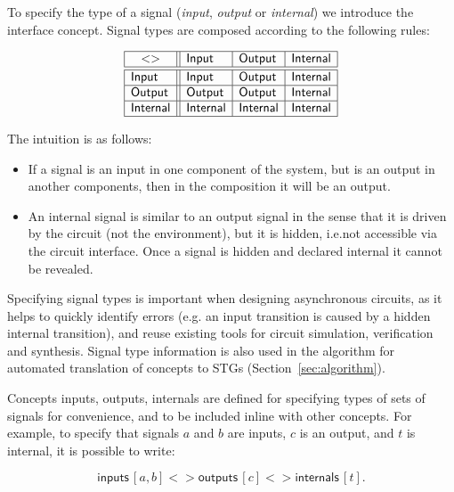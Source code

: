 \documentclass[british,conference,compsoc]{IEEEtran}
\begin{document}
To specify the type of a signal (\emph{input},
\emph{output} or \emph{internal}) we introduce the \textsf{interface} concept.
Signal types are composed according to the following rules:

\vspace{-2mm}

\[
\begin{array}{|l||l|l|l|}
\hline
\multicolumn{1}{|c||}{<>} & \mathsf{Input} & \mathsf{Output} &
\mathsf{Internal} \\ \hline \hline
\mathsf{Input} & \mathsf{Input} & \mathsf{Output} & \mathsf{Internal} \\ \hline
\mathsf{Output} & \mathsf{Output} & \mathsf{Output} & \mathsf{Internal} \\
\hline
\mathsf{Internal}& \mathsf{Internal} & \mathsf{Internal} & \mathsf{Internal} \\
\hline
\end{array}
\]

The intuition is as follows:
\begin{itemize}
    \item If a signal is an input in one component of the system, but is an
    output in another components, then in the composition it will be an output.
    \item An internal signal is similar to an output signal in the sense
that it is driven by the circuit (not the environment), but it is hidden, 
i.e.not accessible via the circuit interface. Once a signal is hidden and 
declared internal it cannot be revealed.
\end{itemize}

\noindent Specifying signal types is important when designing asynchronous
circuits, as it helps to quickly identify errors (e.g. an input transition is
caused by a hidden internal transition), and reuse existing tools for circuit
simulation, verification and synthesis. Signal type information is also used
in the algorithm for automated translation of concepts to
STGs (Section~\ref{sec:algorithm}).

Concepts \textsf{inputs}, \textsf{outputs}, \textsf{internals} are defined for
specifying types of sets of signals for convenience, and to be included inline 
with other concepts. For example, to specify that signals $a$ and $b$ are 
inputs, $c$ is an output, and $t$ is internal, it is possible to write:

\vspace{-4mm}

\[
\mathsf{inputs}\,[a, b] <> \mathsf{outputs}\,[c] <>
\mathsf{internals}\,[t].
\]
\end{document}
